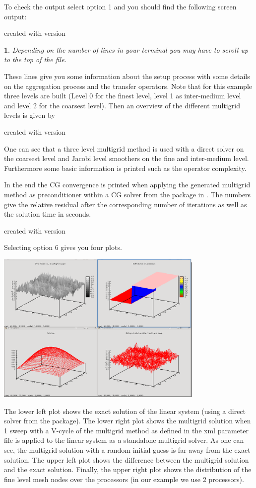 \documentclass[10pt,fleqn]{book}
\newtheorem*{mycomment}{\ding{42}}
\newcommand\printScreenOutput[1]{

{\vspace{-0.3cm}\hfill\tiny{created with \muelu version }}
}
\begin{document}
To check the output select option 1 and you should find the following screen output:

\printScreenOutput{s1_easy.txt_3.fragment_1.fragment}

\begin{mycomment}
Depending on the number of lines in your terminal you may have to scroll up to the top of the file.
\end{mycomment}

These lines give you some information about the setup process with some details on the aggregation process and the transfer operators. Note that for this example three levels are built (Level 0 for the finest level, level 1 as inter-medium level and level 2 for the coarsest level). Then an overview of the different multigrid levels is given by

\printScreenOutput{s1_easy.txt_3.fragment_3.fragment}

One can see that a three level multigrid method is used with a direct solver on the coarsest level and Jacobi level smoothers on the fine and inter-medium level. Furthermore some basic information is printed such as the operator complexity.

In the end the CG convergence is printed when applying the generated multigrid method as preconditioner within a CG solver from the \aztecoo package in \trilinos.
The numbers give the relative residual after the corresponding number of iterations as well as the solution time in seconds.
\printScreenOutput{s1_easy.txt_5.fragment}

Selecting option 6 gives you four plots.
\begin{center}\includegraphics[width=10cm]{pics/tut1_6.png} \end{center}
The lower left plot shows the exact solution of the linear system (using a direct solver from the \amesos package). The lower right plot shows the multigrid solution when 1 sweep with a V-cycle of the multigrid method as defined in the xml parameter file is applied to the linear system as a standalone multigrid solver. As one can see, the multigrid solution with a random initial guess is far away from the exact solution. The upper left plot shows the difference between the multigrid solution and the exact solution. Finally, the upper right plot shows the distribution of the fine level mesh nodes over the processors (in our example we use 2 processors).
\end{document}
